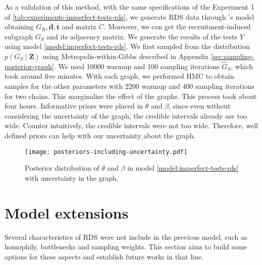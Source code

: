 As a validation of this method, with the same specifications of the Experiment
1 of \autoref{tab:experiments-imperfect-tests-rds}, we generate RDS data
through \textcite{crawford2016}'s model obtaining $G_R, \boldsymbol{d},
\boldsymbol{t}$ and matrix $C$. Moreover, we can get the recruitment-induced
subgraph $G_S$ and its adjacency matrix. We generate the results of the tests
$Y$ using model \eqref{model:imperfect-tests-rds}. We first sampled from the
distribution $p(G_S \mid \boldsymbol{Z})$ using Metropolis-within-Gibbs
described in Appendix \ref{sec:sampling-posterior-graph}. We used 10000 warmup
and 100 sampling iterations $\hat{G}_S$, which took around five minutes. With each
graph, we performed HMC to obtain samples for the other parameters with 2200
warmup and 400 sampling iterations for two chains. This marginalize the
effect of the graphs. This process took about four hours. Informative priors
were placed in $\theta$ and $\beta$, since even without considering the
uncertainty of the graph, the credible intervals already are too wide. Counter
intuitively, the credible intervals were not too wide. Therefore, well defined
priors can help with our uncertainty about the graph. 

\begin{figure}[htbp]
  \centering
  \caption{\label{fig:posteriors-including-uncertainty}Posterior distribution
  of $\theta$ and $\beta$ in model \eqref{model:imperfect-tests-rds} with
  uncertainty in the graph.}
  \texttt{[image: posteriors-including-uncertainty.pdf]}
\end{figure}

\section{Model extensions}

Several characteristics of RDS were not include in the previous model, such as
homophily, bottlenecks and sampling weights. This section aims to build some
options for these aspects and establish future works in that line.


